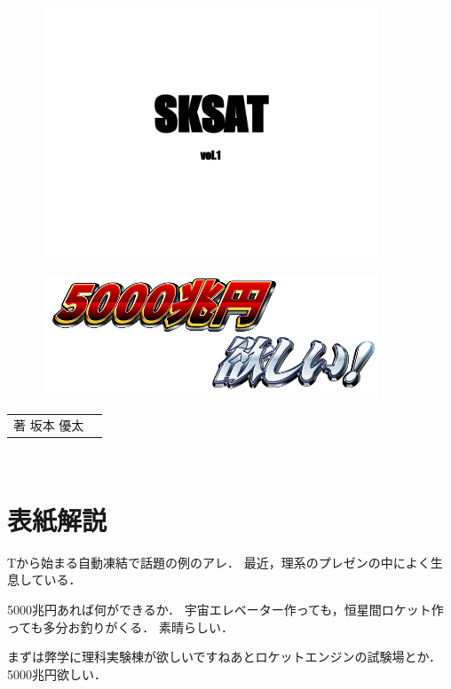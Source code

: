 \begin{titlepage}
\begin{center}
\vspace*{3pt}
\begin{figure}
\centering
\includegraphics[width=10cm]{img/front-page.png}
\end{figure}

\begin{figure}[h]
\centering
\includegraphics[width=10cm]{img/5000trillion-yen.png}
\end{figure}
\vspace{20pt} 
\begin{tabular}{rl}
著 坂本 優太
\end{tabular}
\vspace{3pt} \\
\date{yy/mm/dd} \vspace{12pt}
\end{center}
\end{titlepage}

\newpage

\chapter*{表紙解説}
Tから始まる自動凍結で話題の例のアレ．
最近，理系のプレゼンの中によく生息している．

5000兆円あれば何ができるか．
宇宙エレベーター作っても，恒星間ロケット作っても多分お釣りがくる．
素晴らしい．


まずは弊学に理科実験棟が欲しいですねあとロケットエンジンの試験場とか．5000兆円欲しい．

